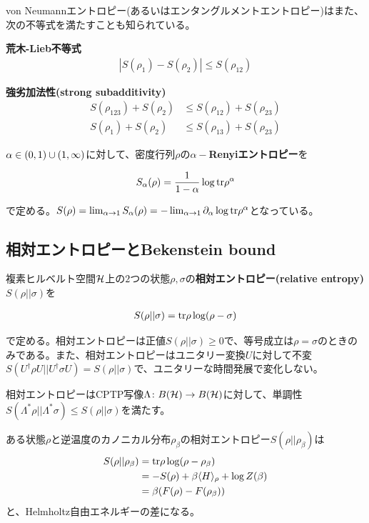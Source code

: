 \hfill\newline

von Neumannエントロピー(あるいはエンタングルメントエントロピー)はまた、次の不等式を満たすことも知られている。

\textbf{荒木-Lieb不等式}
\begin{align}
|S(\rho_1)-S(\rho_2)|\leq S(\rho_{12})
\end{align}

\textbf{強劣加法性(strong subadditivity)}
\begin{align}
S(\rho_{123})+S(\rho_2)&\leq S(\rho_{12})+S(\rho_{23})\\
S(\rho_{1})+S(\rho_2)&\leq S(\rho_{13})+S(\rho_{23})\label{ssa}
\end{align}

$\alpha\in(0,1)\cup (1,\infty)$に対して、密度行列$\rho$の\textbf{$\alpha-$Renyiエントロピー}を
\begin{oframed}
\begin{align}
S_\alpha(\rho)=\frac{1}{1-\alpha}\log \textnormal{tr} \rho^\alpha
\end{align}
\end{oframed}
で定める。$S(\rho)=\lim_{\alpha\to 1}S_\alpha (\rho)=-\lim_{\alpha\to 1}\partial_{\alpha} \log \textnormal{tr} \rho^\alpha$となっている。

\subsection{相対エントロピーとBekenstein bound}
複素ヒルベルト空間$\mathcal{H}$上の$2$つの状態$\rho,\sigma$の\textbf{相対エントロピー(relative entropy)}$S(\rho||\sigma)$を
\begin{oframed}
\begin{align}
S(\rho||\sigma)=\textnormal{tr} \rho\log(\rho-\sigma)
\end{align}
\end{oframed}
で定める。相対エントロピーは正値$S(\rho||\sigma)\geq 0$で、等号成立は$\rho=\sigma$のときのみである。また、相対エントロピーはユニタリー変換$U$に対して不変$S(U^\dagger\rho U||U^\dagger \sigma U)=S(\rho||\sigma)$で、ユニタリーな時間発展で変化しない。

相対エントロピーはCPTP写像$\Lambda\colon B(\mathcal{H})\to B(\mathcal{H})$に対して、単調性$S(\Lambda^\ast \rho||\Lambda^\ast \sigma)\leq S(\rho||\sigma)$を満たす。
\begin{ex}
	ある状態$\rho$と逆温度のカノニカル分布$\rho_\beta$の相対エントロピー$S(\rho||\rho_\beta)$は
	\begin{align}
	S(\rho||\rho_\beta)&=\textnormal{tr} \rho\log(\rho-\rho_\beta)\notag\\
	&=-S(\rho)+\beta\langle H\rangle_{\rho}+\log Z(\beta)\\
	&=\beta(F(\rho)-F(\rho_\beta))
	\end{align}
	と、Helmholtz自由エネルギーの差になる。
\end{ex}

